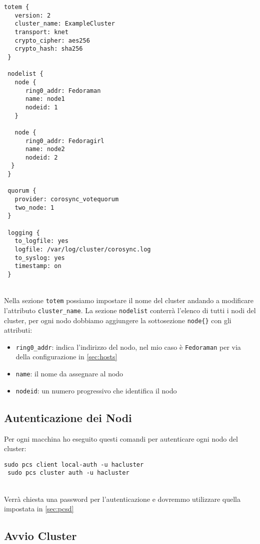 \begin{lstlisting}[style=cmd]
 totem {
   version: 2
   cluster_name: ExampleCluster
   transport: knet
   crypto_cipher: aes256
   crypto_hash: sha256
 }

 nodelist {
   node {
      ring0_addr: Fedoraman
      name: node1
      nodeid: 1
   }
	
   node {
      ring0_addr: Fedoragirl
      name: node2
      nodeid: 2
  }
 }

 quorum {
   provider: corosync_votequorum
   two_node: 1
 }

 logging {
   to_logfile: yes
   logfile: /var/log/cluster/corosync.log
   to_syslog: yes
   timestamp: on
 }
\end{lstlisting}
\ \\
Nella sezione \lstinline[style=cmd]|totem| possiamo impostare il nome del cluster andando a modificare l'attributo \lstinline[style=cmd]|cluster_name|. La sezione \lstinline[style=cmd]|nodelist| conterr\`{a} l'elenco di tutti i nodi del cluster, per ogni nodo dobbiamo aggiungere la sottosezione \lstinline[style=cmd]|node{}| con gli attributi:

\begin{itemize}
	\item \lstinline[style=cmd]|ring0_addr|: indica l'indirizzo del nodo, nel mio caso \`{e} \lstinline[style=cmd]|Fedoraman| per via della configurazione in \autoref{sec:hosts}
	\item \lstinline[style=cmd]|name|: il nome da assegnare al nodo
	\item \lstinline[style=cmd]|nodeid|: un numero progressivo che identifica il nodo
\end{itemize}

\subsection{Autenticazione dei Nodi}

Per ogni macchina ho eseguito questi comandi per autenticare ogni nodo del cluster:

\begin{lstlisting}[style=cmd]
 sudo pcs client local-auth -u hacluster
 sudo pcs cluster auth -u hacluster
\end{lstlisting}
\ \\
Verr\`{a} chiesta una password per l'autenticazione e dovremmo utilizzare quella impostata in \autoref{sec:pcsd}

\subsection{Avvio Cluster}

